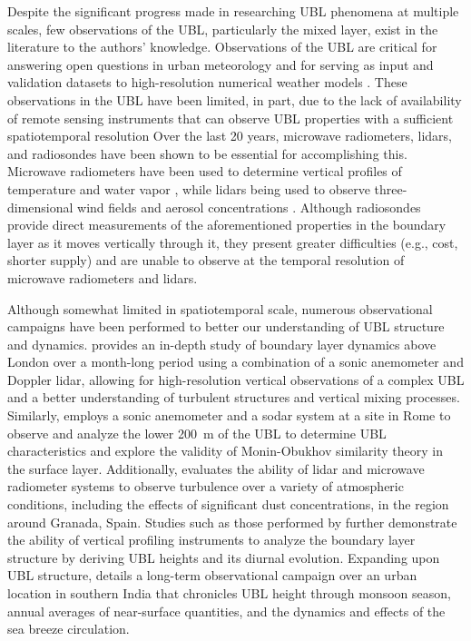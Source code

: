 Despite the significant progress made in researching UBL phenomena at multiple scales, few observations of the UBL, particularly the mixed layer, exist in the literature to the authors' knowledge. Observations of the UBL are critical for answering open questions in urban meteorology and for serving as input and validation datasets to high-resolution numerical weather models \citep{barlow2014, best2005, edwards2020, leroyer2014, ronda2017}. These observations in the UBL have been limited, in part, due to the lack of availability of remote sensing instruments that can observe UBL properties with a sufficient spatiotemporal resolution \citep{barlow2014, davis2021, roth2000, zhang2020} Over the last 20 years, microwave radiometers, lidars, and radiosondes have been shown to be essential for accomplishing this. Microwave radiometers have been used to determine vertical profiles of temperature and water vapor \citep{rose2005, wang2012}, while lidars being used to observe three-dimensional wind fields and aerosol concentrations \citep{grund2001}. Although radiosondes provide direct measurements of the aforementioned properties in the boundary layer as it moves vertically through it, they present greater difficulties (e.g., cost, shorter supply) and are unable to observe at the temporal resolution of microwave radiometers and lidars. 

Although somewhat limited in spatiotemporal scale, numerous observational campaigns have been performed to better our understanding of UBL structure and dynamics. \citet{barlow2011} provides an in-depth study of boundary layer dynamics above London over a month-long period using a combination of a sonic anemometer and Doppler lidar, allowing for high-resolution vertical observations of a complex UBL and a better understanding of turbulent structures and vertical mixing processes. Similarly, \citet{pelliccioni2012} employs a sonic anemometer and a sodar system at a site in Rome to observe and analyze the lower \SI{200}{\meter} of the UBL to determine UBL characteristics and explore the validity of Monin-Obukhov similarity theory in the surface layer. Additionally, \citet{dearrudamoreira2020} evaluates the ability of lidar and microwave radiometer systems to observe turbulence over a variety of atmospheric conditions, including the effects of significant dust concentrations, in the region around Granada, Spain. Studies such as those performed by \citet{banks2015, quan2013, wang2012} further demonstrate the ability of vertical profiling instruments to analyze the boundary layer structure by deriving UBL heights and its diurnal evolution. Expanding upon UBL structure, \citet{anurose2018} details a long-term observational campaign over an urban location in southern India that chronicles UBL height through monsoon season, annual averages of near-surface quantities, and the dynamics and effects of the sea breeze circulation. 

